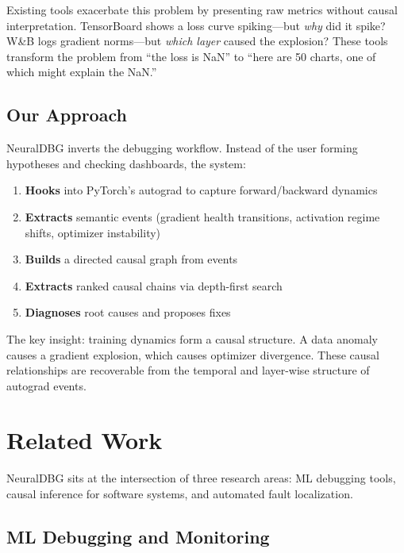 \documentclass[11pt]{article}
\begin{document}
Existing tools exacerbate this problem by presenting raw metrics without causal interpretation. TensorBoard shows a loss curve spiking—but \emph{why} did it spike? W\&B logs gradient norms—but \emph{which layer} caused the explosion? These tools transform the problem from ``the loss is NaN'' to ``here are 50 charts, one of which might explain the NaN.''

\subsection{Our Approach}

NeuralDBG inverts the debugging workflow. Instead of the user forming hypotheses and checking dashboards, the system:

\begin{enumerate}
    \item \textbf{Hooks} into PyTorch's autograd to capture forward/backward dynamics
    \item \textbf{Extracts} semantic events (gradient health transitions, activation regime shifts, optimizer instability)
    \item \textbf{Builds} a directed causal graph from events
    \item \textbf{Extracts} ranked causal chains via depth-first search
    \item \textbf{Diagnoses} root causes and proposes fixes
\end{enumerate}

The key insight: training dynamics form a causal structure. A data anomaly causes a gradient explosion, which causes optimizer divergence. These causal relationships are recoverable from the temporal and layer-wise structure of autograd events.

\section{Related Work}

NeuralDBG sits at the intersection of three research areas: ML debugging tools, causal inference for software systems, and automated fault localization.

\subsection{ML Debugging and Monitoring}
\end{document}
